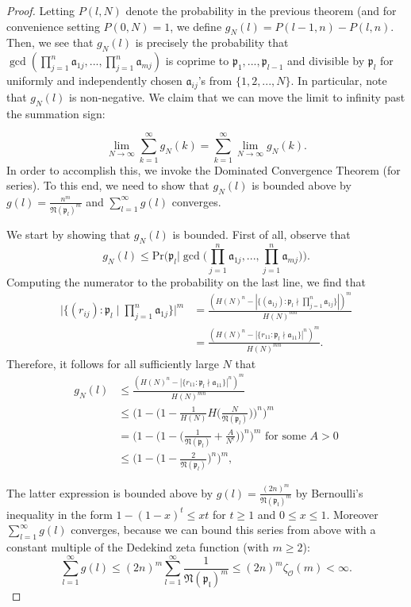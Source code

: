 \documentclass[10pt,a4paper]{article}
\theoremstyle{definition}
\theoremstyle{remark}
\newcommand{\f}[1]{\mathfrak{#1}}
\begin{document}
\begin{proof}
Letting $P(l, N)$ denote the probability in the previous theorem (and for convenience setting $P(0, N) = 1$, we define $g_N(l) = P(l-1, n) - P(l, n)$. Then, we see that $g_N(l)$ is precisely the probability that $\gcd(\prod_{j=1}^n \mathfrak{a}_{1j}, ... , \prod_{j=1}^n \mathfrak{a}_{mj})$ is coprime to $\mathfrak{p}_1, ..., \mathfrak{p}_{l-1}$ and divisible by $\mathfrak{p}_l$ for uniformly and independently chosen $\mathfrak{a}_{ij}$'s from $\{1, 2, ..., N\}$. In particular, note that $g_N(l)$ is non-negative. We claim that we can move the limit to infinity past the summation sign:

$$\lim_{N \to \infty} \sum_{k=1}^{\infty} g_N(k) = \sum_{k=1}^{\infty} \lim_{N \to \infty} g_N(k).$$
In order to accomplish this, we invoke the Dominated Convergence Theorem (for series). To this end, we need to show that $g_N(l)$ is bounded above by $g(l) = \frac{n^m}{\mathfrak{N}(\mathfrak{p}_l)^m}$ and $\sum_{l=1}^{\infty} g(l)$ converges.

We start by showing that $g_N(l)$ is bounded. First of all, observe that
$$g_N(l) \leq \text{Pr}\Big(\mathfrak{p}_l \Big| \gcd\Big(\prod_{j=1}^n \mathfrak{a}_{1j}, ... , \prod_{j=1}^n \mathfrak{a}_{mj}\Big)\Big).$$
Computing the numerator to the probability on the last line, we find that
\begin{align*} 
\Big|\{(r_{ij}) : \mathfrak{p}_l \mid \prod_{j=1}^n \mathfrak{a}_{1j}\}\Big|^m &= \frac{(H(N)^n - |\{(\mathfrak{a}_{1j}) : \mathfrak{p}_l \nmid \prod_{j=1}^n \mathfrak{a}_{1j}\}|)^m}{H(N)^{mn}}\\ &= \frac{(H(N)^n - |\{r_{11} : \mathfrak{p}_l \nmid \mathfrak{a}_{11}\}|^n)^m}{H(N)^{mn}}. \end{align*}
Therefore, it follows for all sufficiently large $N$ that
\begin{align*} 
g_N(l) &\leq \frac{(H(N)^n - |\{r_{11} : \mathfrak{p}_l \nmid \mathfrak{a}_{11}\}|^n)^m}{H(N)^{mn}}\\ &\leq \Big(1 - \Big(1 - \frac{1}{H(N)} H\Big(\frac{N}{\f{N}(\f{p}_l)}\Big)\Big)^n\Big)^m\\
&= \Big(1- \Big(1 - \Big(\frac{1}{\mathfrak{N}(\mathfrak{p}_l)} + \frac{A}{N^{\epsilon}}\Big)\Big)^n \Big)^m \text{ for some } A > 0\\ &\leq \Big(1- \Big(1 - \frac{2}{\mathfrak{N}(\mathfrak{p}_l)}\Big)^n \Big)^m, \end{align*}

The latter expression is bounded above by $g(l) = \frac{(2n)^m}{\f{N(\f{p}_l)}^m}$ by Bernoulli's inequality in the form $1-(1-x)^t\leq xt$ for $t\geq 1$ and $0\leq x \leq 1$. Moreover $\sum_{l=1}^{\infty} g(l)$ converges, because we can bound this series from above with a constant multiple of the Dedekind zeta function (with $m \geq 2$):
$$\sum_{l=1}^{\infty}g(l)\leq (2n)^m\sum_{l=1}^{\infty}\frac{1}{\f{N(\f{p}_l)}^m}\leq (2n)^m \zeta_{\mathcal{O}}(m) < \infty.$$


\end{proof}
\end{document}
